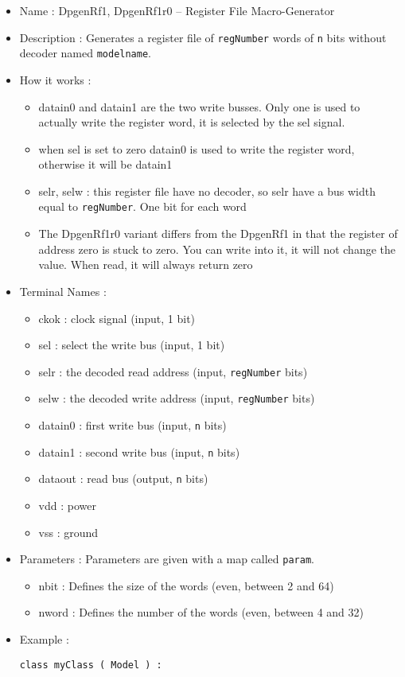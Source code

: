 \begin{itemize}
    \item Name : DpgenRf1, DpgenRf1r0 -- Register File Macro-Generator
    \item Description : Generates a register file of \verb-regNumber- words of \verb-n- bits without decoder named \verb-modelname-.
    \item How it works :
    \begin{itemize}
        \item datain0 and datain1 are the two write busses. Only one is used to actually write the register word, it is selected by the sel signal.
        \item when sel is set to zero datain0 is used to write the register word, otherwise it will be datain1
        \item selr, selw : this register file have no decoder, so selr have a bus width equal to \verb-regNumber-. One bit for each word
        \item The DpgenRf1r0 variant differs from the DpgenRf1 in that the register of address zero is stuck to zero. You can write into it, it will not change the value. When read, it will always return zero
    \end{itemize}
    \item Terminal Names :
    \begin{itemize}
        \item ckok : clock signal (input, 1 bit)
        \item sel : select the write bus (input, 1 bit)
        \item selr : the decoded read address (input, \verb-regNumber- bits)
        \item selw : the decoded write address (input, \verb-regNumber- bits)
        \item datain0 : first write bus (input, \verb-n- bits)
        \item datain1 : second write bus (input, \verb-n- bits)
        \item dataout : read bus (output, \verb-n- bits)
        \item vdd : power
        \item vss : ground
    \end{itemize}
    \item Parameters : Parameters are given with a map called \verb-param-.
    \begin{itemize}
        \item nbit : Defines the size of the words  (even, between 2 and 64)
        \item nword : Defines the number of the words (even, between 4 and 32)
    \end{itemize}
    \item Example :
\begin{verbatim}
class myClass ( Model ) :
    

\end{verbatim}
\end{itemize}

